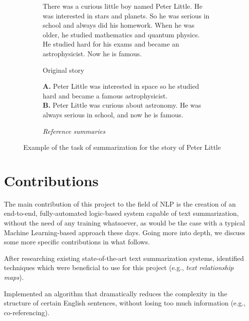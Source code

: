 \begin{figure}[H]
\begin{subfigure}{\textwidth}
\begin{displayquote}
There was a curious little boy named Peter Little. He was interested in stars and planets. So he was serious in school and always did his homework. When he was older, he studied mathematics and quantum physics. He studied hard for his exams and became an astrophysicist. Now he is famous.
\end{displayquote}
\caption{Original story}
\vspace{\baselineskip}
\end{subfigure}
\begin{subfigure}{\textwidth}
\begin{displayquote}
\textbf{A.} Peter Little was interested in space so he studied hard and became a famous astrophysicist.\\
\textbf{B.} Peter Little was curious about astronomy. He was always serious in school, and now he is famous.
\end{displayquote}
\caption{\textit{Reference summaries}}
\end{subfigure}
\caption{Example of the task of summarization for the story of Peter Little}
\label{fig:peter_little}
\end{figure}

\section{Contributions}

The main contribution of this project to the field of NLP is the creation of an end-to-end, fully-automated logic-based system capable of text summarization, without the need of any training whatsoever, as would be the case with a typical Machine Learning-based approach these days. Going more into depth, we discuss some more specific contributions in what follows.

\begin{contribution}
After researching existing state-of-the-art text summarization systems, identified techniques which were beneficial to use for this project (e.g., \textit{text relationship maps}).
\end{contribution}

\begin{contribution}
Implemented an algorithm that dramatically reduces the complexity in the structure of certain English sentences, without losing too much information (e.g., co-referencing).
\end{contribution}

